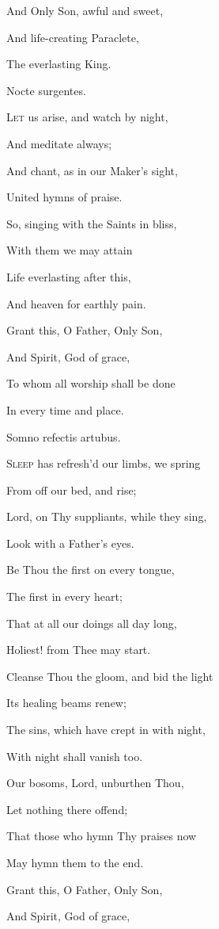 And Only Son, awful and sweet,

And life-creating Paraclete,

The everlasting King.


Nocte surgentes.

L\textsc{et} us arise, and watch by night,

And meditate always;

And chant, as in our Maker's sight,

United hymns of praise.

So, singing with the Saints in bliss,

With them we may attain

Life everlasting after this,

And heaven for earthly pain.

Grant this, O Father, Only Son,

And Spirit, God of grace,

To whom all worship shall be done

In every time and place.


Somno refectis artubus.

S\textsc{leep} has refresh'd our limbs, we spring

From off our bed, and rise;

Lord, on Thy suppliants, while they sing,

Look with a Father's eyes.

Be Thou the first on every tongue,

The first in every heart;

That at all our doings all day long,

Holiest! from Thee may start.

Cleanse Thou the gloom, and bid the light

Its healing beams renew;

The sins, which have crept in with night,

With night shall vanish too. 

Our bosoms, Lord, unburthen Thou,

Let nothing there offend;

That those who hymn Thy praises now

May hymn them to the end.

Grant this, O Father, Only Son,

And Spirit, God of grace,

